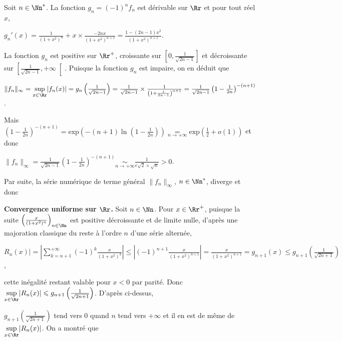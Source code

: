 {\begin{enumerate}
{Soit $n\in\Nn^*$. La fonction $g_n=(-1)^nf_n$ est dérivable sur $\Rr$ et pour tout réel $x$,

\begin{center}
$g_n'(x)=\frac{1}{(1+x^2)^n}+x\times\frac{-2nx}{(1+x^2)^{n+1}}=\frac{1-(2n-1)x^2}{(1+x^2)^{n+1}}$.
\end{center}

La fonction $g_n$ est positive sur $\Rr^+$, croissante sur $\left[0,\frac{1}{\sqrt{2n-1}}\right]$ et décroissante sur $\left[\frac{1}{\sqrt{2n-1}},+\infty\right[$. Puisque la fonction $g_n$ est impaire, on en déduit que

\begin{center}
$\|f_n\|_\infty=\underset{x\in\Rr}{\text{sup}}|f_n(x)|=g_n\left(\frac{1}{\sqrt{2n-1}}\right)=\frac{1}{\sqrt{2n-1}}\times\frac{1}{\left(1+\frac{1}{2n-1}\right)^{n+1}}=\frac{1}{\sqrt{2n-1}}\left(1-\frac{1}{2n}\right)^{-(n+1)}$.
\end{center}

Mais $\left(1-\frac{1}{2n}\right)^{-(n+1)}=\text{exp}\left(-(n+1)\ln\left(1-\frac{1}{2n}\right)\right)\underset{n\rightarrow+\infty}{=}\text{exp}\left(\frac{1}{2}+o(1)\right)$ et donc 

\begin{center}
$\|f_n\|_\infty=\frac{1}{\sqrt{2n-1}}\left(1-\frac{1}{2n}\right)^{-(n+1)}\underset{n\rightarrow+\infty}{\sim}\frac{1}{e\sqrt{2}\times\sqrt{n}}>0$.
\end{center}

Par suite, la série numérique de terme général $\|f_n\|_\infty$, $n\in\Nn^*$, diverge et donc

\begin{center}
\end{center}

\textbf{Convergence uniforme sur $\Rr$.} Soit $n\in\Nn$. Pour $x\in\Rr^+$, puisque la suite $\left(\frac{x}{(1+x^2)^n}\right)_{n\in\Nn}$ est positive décroissante et de limite nulle, d'après une majoration classique du reste à l'ordre $n$ d'une série alternée,

\begin{center}
$R_n(x)|=\left|\sum_{k=n+1}^{+\infty}(-1)^k\frac{x}{(1+x^2)^k}\right|\leqslant\left|(-1)^{n+1}\frac{x}{(1+x^2)^{n+1}}\right|=\frac{x}{(1+x^2)^{n+1}}=g_{n+1}(x)\leqslant g_{n+1}\left(\frac{1}{\sqrt{2n+1}}\right)$,
\end{center}

cette inégalité restant valable pour $x<0$ par parité. Donc $\underset{x\in\Rr}{\text{sup}}|R_n(x)|\leqslant g_{n+1}\left(\frac{1}{\sqrt{2n+1}}\right)$. D'après ci-dessus, 

$g_{n+1}\left(\frac{1}{\sqrt{2n+1}}\right)$ tend vers $0$ quand $n$ tend vers $+\infty$ et il en est de même de $\underset{x\in\Rr}{\text{sup}}|R_n(x)|$. On a montré que

\begin{center}
\end{center}}
\end{enumerate}
}
